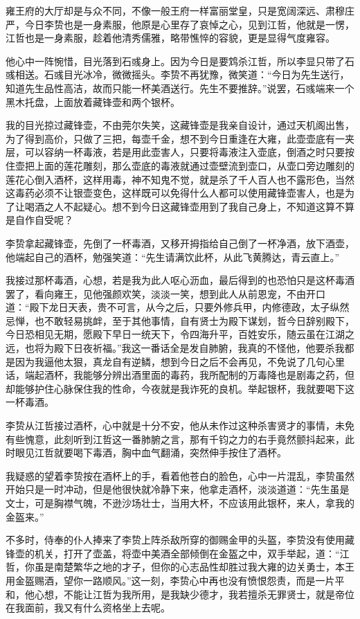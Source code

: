 雍王府的大厅却是与众不同，不像一般王府一样富丽堂皇，只是宽阔深远、肃穆庄严，今日李贽也是一身素服，他原是心里存了哀悼之心，见到江哲，他就是一愣，江哲也是一身素服，趁着他清秀儒雅，略带憔悴的容貌，更是显得气度雍容。

他心中一阵惋惜，目光落到石彧身上。因为今日是要鸩杀江哲，所以李显只带了石彧相送。石彧目光冰冷，微微摇头。李贽不再犹豫，微笑道：“今日为先生送行，知道先生品性高洁，故而只能一杯美酒送行。先生不要推辞。”说罢，石彧端来一个黑木托盘，上面放着藏锋壶和两个银杯。

我的目光掠过藏锋壶，不由莞尔失笑，这藏锋壶是我亲自设计，通过天机阁出售，为了得到高价，只做了三把，每壶千金，想不到今日重逢在大雍，此壶壶底有一夹层，可以容纳一杯毒液，若是用此壶害人，只要将毒液注入壶底，倒酒之时只要按住壶把上面的莲花雕刻，那么壶底的毒液就通过壶壁流到壶口，从壶口旁边雕刻的莲花心倒入酒杯，这样用毒，神不知鬼不觉，就是杀了千人百人也不露形色，当然这毒药必须不让银壶变色，这样既可以免得什么人都可以使用藏锋壶害人，也是为了让喝酒之人不起疑心。想不到今日这藏锋壶用到了我自己身上，不知道这算不算是自作自受呢？

李贽拿起藏锋壶，先倒了一杯毒酒，又移开拇指给自己倒了一杯净酒，放下酒壶，他端起自己的酒杯，勉强笑道：“先生请满饮此杯，从此飞黄腾达，青云直上。”

我接过那杯毒酒，心想，若是我为此人呕心沥血，最后得到的也恐怕只是这杯毒酒罢了，看向雍王，见他强颜欢笑，淡淡一笑，想到此人从前恩宠，不由开口道：“殿下龙日天表，贵不可言，从今之后，只要外修兵甲，内修德政，太子纵然忌惮，也不敢轻易挑衅，至于其他事情，自有贤士为殿下谋划，哲今日辞别殿下，今日恐相见无期，愿殿下早日一统天下，令四海升平，百姓安乐，随云虽在江湖之远，也将为殿下日夜祈福。”我这一番话全是发自肺腑，我真的不怪他，他要杀我都是因为我逼他太狠，真龙自有逆鳞，想到今日之后不会再见，不免说了几句心里话，端起酒杯，我能够分辨出酒里面的毒药，我所配制的万毒降也是剧毒之药，但却能够护住心脉保住我的性命，今夜就是我诈死的良机。举起银杯，我就要喝下这一杯毒酒。

李贽从江哲接过酒杯，心中就是十分不安，他从未作过这种杀害贤才的事情，未免有些愧意，此刻听到江哲这一番肺腑之言，那有千钧之力的右手竟然颤抖起来，此时眼见江哲就要喝下毒酒，胸中血气翻涌，突然伸手按住了酒杯。

我疑惑的望着李贽按在酒杯上的手，看着他苍白的脸色，心中一片混乱，李贽虽然开始只是一时冲动，但是他很快就冷静下来，他拿走酒杯，淡淡道道：“先生虽是文士，可是胸襟气魄，不逊沙场壮士，当用大杯，不应该用此银杯，来人，拿我的金盔来。”

不多时，侍奉的仆人捧来了李贽上阵杀敌所穿的御赐金甲的头盔，李贽没有使用藏锋壶的机关，打开了壶盖，将壶中美酒全部倾倒在金盔之中，双手举起，道：“江哲，你虽是南楚繁华之地的才子，但你的心志品性却胜过我大雍的边关勇士，本王用金盔赐酒，望你一路顺风。”这一刻，李贽心中再也没有愤恨怨责，而是一片平和，他心想，不能让江哲为我所用，是我缺少德才，我若擅杀无罪贤士，就是帝位在我面前，我又有什么资格坐上去呢。

